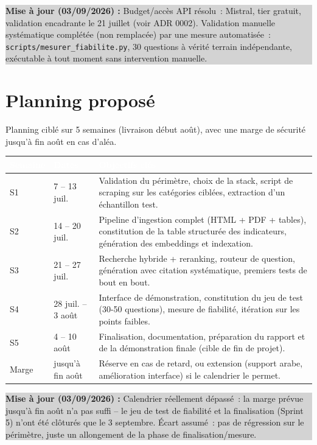 \documentclass[11pt,a4paper]{article}
\newcommand{\tblhead}[1]{\textcolor{white}{\textbf{#1}}}
\newcommand{\majcadrage}[1]{%
\par\vspace{0.35cm}
\noindent\colorbox{lightgrey}{%
\begin{minipage}{\dimexpr\linewidth-2\fboxsep}
\vspace{0.15cm}
\textbf{\color{gold}Mise \`a jour (03/09/2026) :} #1
\vspace{0.15cm}
\end{minipage}%
}
\vspace{0.35cm}
}
\begin{document}
\majcadrage{Budget/acc\`es API r\'esolu~: Mistral, tier gratuit, validation encadrante le 21 juillet (voir ADR 0002). Validation manuelle syst\'ematique compl\'et\'ee (non remplac\'ee) par une mesure automatis\'ee~: \texttt{scripts/mesurer\_fiabilite.py}, 30 questions \`a v\'erit\'e terrain ind\'ependante, ex\'ecutable \`a tout moment sans intervention manuelle.}

\section{Planning propos\'e}
Planning cibl\'e sur 5 semaines (livraison d\'ebut ao\^ut), avec une marge de s\'ecurit\'e jusqu'\`a fin ao\^ut en cas d'al\'ea.

\begin{longtable}{@{}p{1.8cm}p{2.8cm}p{11.6cm}@{}}
\rowcolor{navy}
\tblhead{Semaine} & \tblhead{Dates} & \tblhead{Objectifs cl\'es} \\
\midrule
\endhead
S1 & 7 -- 13 juil. & Validation du p\'erim\`etre, choix de la stack, script de scraping sur les cat\'egories cibl\'ees, extraction d'un \'echantillon test. \\
S2 & 14 -- 20 juil. & Pipeline d'ingestion complet (HTML + PDF + tables), constitution de la table structur\'ee des indicateurs, g\'en\'eration des embeddings et indexation. \\
S3 & 21 -- 27 juil. & Recherche hybride + reranking, routeur de question, g\'en\'eration avec citation syst\'ematique, premiers tests de bout en bout. \\
S4 & 28 juil. -- 3 ao\^ut & Interface de d\'emonstration, constitution du jeu de test (30-50 questions), mesure de fiabilit\'e, it\'eration sur les points faibles. \\
S5 & 4 -- 10 ao\^ut & Finalisation, documentation, pr\'eparation du rapport et de la d\'emonstration finale (cible de fin de projet). \\
Marge & jusqu'\`a fin ao\^ut & R\'eserve en cas de retard, ou extension (support arabe, am\'elioration interface) si le calendrier le permet. \\
\end{longtable}

\majcadrage{Calendrier r\'eellement d\'epass\'e~: la marge pr\'evue jusqu'\`a fin ao\^ut n'a pas suffi -- le jeu de test de fiabilit\'e et la finalisation (Sprint 5) n'ont \'et\'e cl\^otur\'es que le 3 septembre. \'Ecart assum\'e~: pas de r\'egression sur le p\'erim\`etre, juste un allongement de la phase de finalisation/mesure.}
\end{document}
